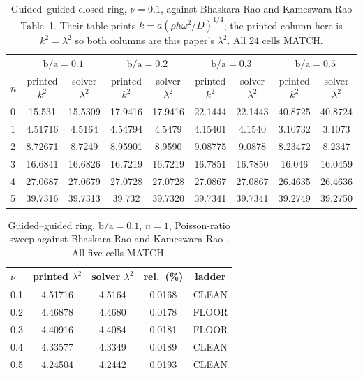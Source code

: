 \documentclass[11pt]{article}
\newcommand{\lamsq}{\lambda^{2}}
\newcommand{\ba}{\mbox{b/a}}
\begin{document}
\begin{table}[htbp]\centering\footnotesize
\caption{Guided--guided closed ring, $\nu=0.1$, against Bhaskara Rao and
Kameswara Rao \cite{bhaskararao2016} Table~1. Their table prints
$k=a(\rho h\omega^{2}/D)^{1/4}$; the printed column here is $k^{2}=\lamsq$
so both columns are this paper's $\lamsq$. All $24$ cells MATCH.}
\label{tab:guided-guided}
\begin{tabular}{lcccccccc}
\toprule
& \multicolumn{2}{c}{$\ba=0.1$} & \multicolumn{2}{c}{$\ba=0.2$}
& \multicolumn{2}{c}{$\ba=0.3$} & \multicolumn{2}{c}{$\ba=0.5$}\\
\cmidrule(lr){2-3}\cmidrule(lr){4-5}\cmidrule(lr){6-7}\cmidrule(lr){8-9}
$n$ & printed $k^{2}$ & solver $\lamsq$ & printed $k^{2}$ & solver $\lamsq$
& printed $k^{2}$ & solver $\lamsq$ & printed $k^{2}$ & solver $\lamsq$\\
\midrule
0 & 15.531 & 15.5309 & 17.9416 & 17.9416 & 22.1444 & 22.1443 & 40.8725 & 40.8724 \\
1 & 4.51716 & 4.5164 & 4.54794 & 4.5479 & 4.15401 & 4.1540 & 3.10732 & 3.1073 \\
2 & 8.72671 & 8.7249 & 8.95901 & 8.9590 & 9.08775 & 9.0878 & 8.23472 & 8.2347 \\
3 & 16.6841 & 16.6826 & 16.7219 & 16.7219 & 16.7851 & 16.7850 & 16.046 & 16.0459 \\
4 & 27.0687 & 27.0679 & 27.0728 & 27.0728 & 27.0867 & 27.0867 & 26.4635 & 26.4636 \\
5 & 39.7316 & 39.7313 & 39.732 & 39.7320 & 39.7341 & 39.7341 & 39.2749 & 39.2750 \\
\bottomrule
\end{tabular}
\end{table}

\begin{table}[htbp]\centering\small
\caption{Guided--guided ring, $\ba=0.1$, $n=1$, Poisson-ratio sweep against
Bhaskara Rao and Kameswara Rao \cite{bhaskararao2016}. All five cells MATCH.}
\label{tab:guided-guided-nu}
\begin{tabular}{lcccc}
\toprule
$\nu$ & printed $\lamsq$ & solver $\lamsq$ & rel.\ (\%) & ladder\\
\midrule
0.1 & 4.51716 & 4.5164 & 0.0168 & CLEAN \\
0.2 & 4.46878 & 4.4680 & 0.0178 & FLOOR \\
0.3 & 4.40916 & 4.4084 & 0.0181 & FLOOR \\
0.4 & 4.33577 & 4.3349 & 0.0189 & CLEAN \\
0.5 & 4.24504 & 4.2442 & 0.0193 & CLEAN \\
\bottomrule
\end{tabular}
\end{table}
\end{document}
